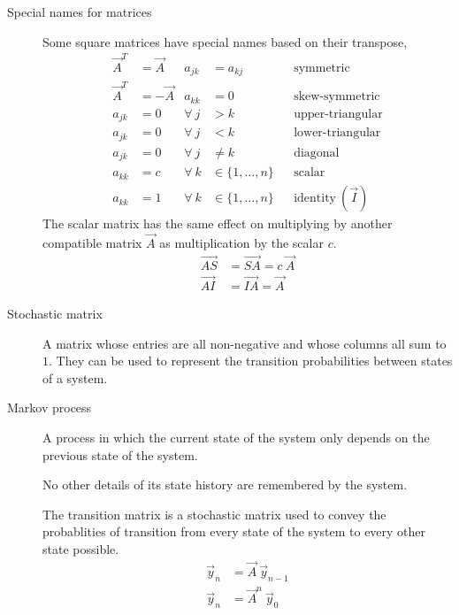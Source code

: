 \begin{description}
    \item[Special names for matrices] Some square matrices have special names based
        on their transpose,
        \begin{align}
            \vec{A}^T & = \vec{A}                  & a_{jk}      & = a_{kj}          &
                      & \text{symmetric}                                               \\
            \vec{A}^T & = -\vec{A}                 & a_{kk}      & = 0               &
                      & \text{skew-symmetric}                                          \\
            a_{jk}    & = 0                        & \forall\  j & > k               &
                      & \text{upper-triangular}                                        \\
            a_{jk}    & = 0                        & \forall\  j & < k               &
                      & \text{lower-triangular}                                        \\
            a_{jk}    & = 0                        & \forall\  j & \neq k            &
                      & \text{diagonal}                                                \\
            a_{kk}    & = c                        & \forall\  k & \in \{1,\dots,n\} &
                      & \text{scalar}                                                  \\
            a_{kk}    & = 1                        & \forall\  k & \in \{1,\dots,n\} &
                      & \text{identity}\ (\vec{I})
        \end{align}
        The scalar matrix has the same effect on multiplying by another compatible matrix
        $ \vec{A} $ as multiplication by the scalar $ c $.
        \begin{align}
            \vec{AS} & = \vec{SA} = c\ \vec{A} \\
            \vec{AI} & = \vec{IA} = \vec{A}
        \end{align}

    \item[Stochastic matrix] A matrix whose entries are all non-negative and whose
        columns all sum to $ 1 $. They can be used to represent the transition
        probabilities between states of a system.

    \item[Markov process] A process in which the current state of the system only depends
        on the previous state of the system. \par
        No other details of its state history are remembered by the system. \par
        The transition matrix is a stochastic matrix used to convey the probablities of
        transition from every state of the system to every other state possible.
        \begin{align}
            \vec{y}_{n} & = \vec{A}\ \vec{y}_{n-1} \\
            \vec{y}_{n} & = \vec{A}^n \ \vec{y}_0
        \end{align}
\end{description}

